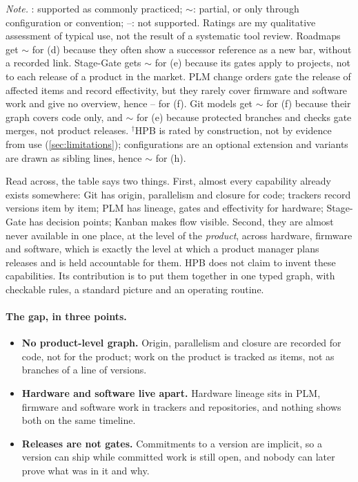\begin{table}[t]
  \smallskip
  \begin{minipage}{\linewidth}
    \footnotesize\emph{Note.} \checkmark: supported as commonly practiced;
    $\sim$: partial, or only through configuration or convention; --: not
    supported. Ratings are my qualitative assessment of typical use, not
    the result of a systematic tool review. Roadmaps get $\sim$ for (d)
    because they often show a successor reference as a new bar, without a
    recorded link. Stage-Gate gets $\sim$ for (e) because its gates apply
    to projects, not to each release of a product in the market. PLM change
    orders gate the release of affected items and record effectivity, but
    they rarely cover firmware and software work and give no overview,
    hence -- for (f). Git models get $\sim$ for (f) because their graph
    covers code only, and $\sim$ for (e) because protected branches and
    checks gate merges, not product releases. $^{\dagger}$HPB is rated by
    construction, not by evidence from use (\cref{sec:limitations});
    configurations are an optional extension and variants are drawn as
    sibling lines, hence $\sim$ for (h).
  \end{minipage}
\end{table}

Read across, the table says two things. First, almost every capability
already exists somewhere: Git has origin, parallelism and closure for
code; trackers record versions item by item; PLM has lineage, gates and
effectivity for hardware; Stage-Gate has decision points; Kanban makes flow
visible. Second, they are almost never available in one place, at the
level of the \emph{product}, across hardware, firmware and software, which
is exactly the level at which a product manager plans releases and is held
accountable for them. HPB does not claim to invent these capabilities. Its
contribution is to put them together in one typed graph, with checkable
rules, a standard picture and an operating routine.

\paragraph{The gap, in three points.}
\begin{itemize}[leftmargin=1.5em,itemsep=2pt,topsep=3pt]
  \item \textbf{No product-level graph.} Origin, parallelism and closure
        are recorded for code, not for the product; work on the product is
        tracked as items, not as branches of a line of versions.
  \item \textbf{Hardware and software live apart.} Hardware lineage sits in
        PLM, firmware and software work in trackers and repositories, and
        nothing shows both on the same timeline.
  \item \textbf{Releases are not gates.} Commitments to a version are
        implicit, so a version can ship while committed work is still open,
        and nobody can later prove what was in it and why.
\end{itemize}

